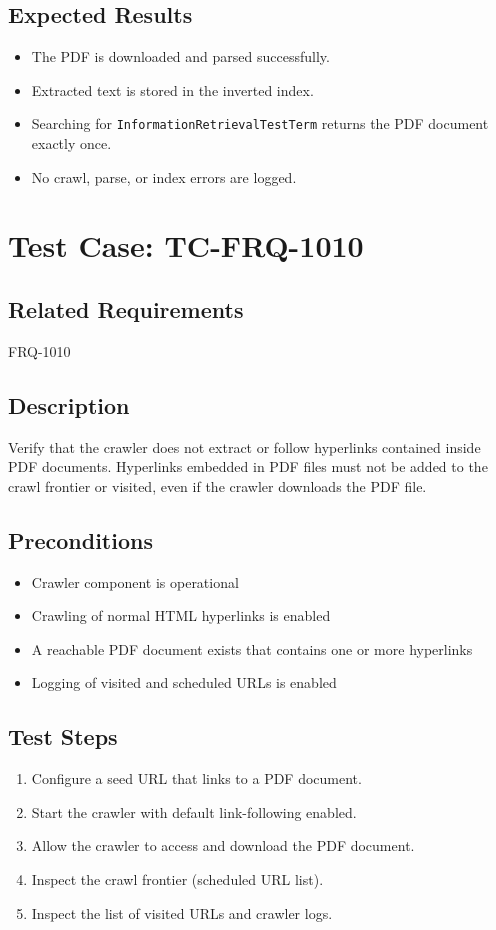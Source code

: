 \documentclass{article}
\begin{document}
\subsection*{Expected Results}
\begin{itemize}
  \item The PDF is downloaded and parsed successfully.
  \item Extracted text is stored in the inverted index.
  \item Searching for \texttt{InformationRetrievalTestTerm} returns the PDF document exactly once.
  \item No crawl, parse, or index errors are logged.
\end{itemize}


\section{Test Case: TC-FRQ-1010}

\subsection*{Related Requirements}
FRQ-1010

\subsection*{Description}
Verify that the crawler does not extract or follow hyperlinks contained
inside PDF documents. Hyperlinks embedded in PDF files must not be added
to the crawl frontier or visited, even if the crawler downloads the PDF file.

\subsection*{Preconditions}
\begin{itemize}
  \item Crawler component is operational
  \item Crawling of normal HTML hyperlinks is enabled
  \item A reachable PDF document exists that contains one or more hyperlinks
  \item Logging of visited and scheduled URLs is enabled
\end{itemize}

\subsection*{Test Steps}
\begin{enumerate}
  \item Configure a seed URL that links to a PDF document.
  \item Start the crawler with default link-following enabled.
  \item Allow the crawler to access and download the PDF document.
  \item Inspect the crawl frontier (scheduled URL list).
  \item Inspect the list of visited URLs and crawler logs.
\end{enumerate}
\end{document}
